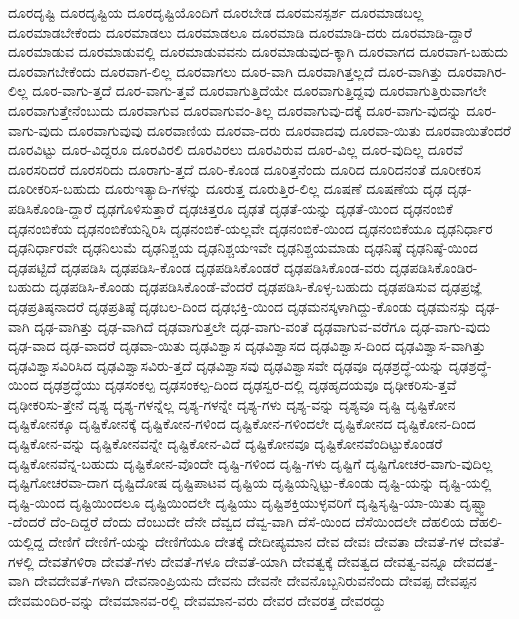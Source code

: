 {ದೂರದೃಷ್ಟಿ
ದೂರದೃಷ್ಟಿಯ
ದೂರದೃಷ್ಟಿಯೊಂದಿಗೆ
ದೂರಬೇಡ
ದೂರಮನಸ್ಪರ್ಶ
ದೂರಮಾಡಬಲ್ಲ
ದೂರಮಾಡಬೇಕೆಂದು
ದೂರಮಾಡಲು
ದೂರಮಾಡಲೂ
ದೂರಮಾಡಿ
ದೂರಮಾಡಿ-ದರು
ದೂರಮಾಡಿ-ದ್ದಾರೆ
ದೂರಮಾಡುವ
ದೂರಮಾಡುವಲ್ಲಿ
ದೂರಮಾಡುವವನು
ದೂರಮಾಡುವುದ-ಕ್ಕಾಗಿ
ದೂರವಾಗದ
ದೂರವಾಗ-ಬಹುದು
ದೂರವಾಗಬೇಕೆಂದು
ದೂರವಾಗ-ಲಿಲ್ಲ
ದೂರವಾಗಲು
ದೂರ-ವಾಗಿ
ದೂರವಾಗಿತ್ತಲ್ಲದೆ
ದೂರ-ವಾಗಿತ್ತು
ದೂರವಾಗಿರ-ಲಿಲ್ಲ
ದೂರ-ವಾಗು-ತ್ತದೆ
ದೂರ-ವಾಗು-ತ್ತವೆ
ದೂರವಾಗುತ್ತಿದೆಯೇ
ದೂರವಾಗುತ್ತಿದ್ದವು
ದೂರವಾಗುತ್ತಿರುವಾಗಲೇ
ದೂರವಾಗುತ್ತೇನೆಂಬುದು
ದೂರವಾಗುವ
ದೂರವಾಗುವಂ-ತಿಲ್ಲ
ದೂರವಾಗುವು-ದಕ್ಕೆ
ದೂರ-ವಾಗು-ವುದನ್ನು
ದೂರ-ವಾಗು-ವುದು
ದೂರವಾಗುವುವು
ದೂರವಾಣಿಯ
ದೂರವಾ-ದರು
ದೂರವಾದವು
ದೂರವಾ-ಯಿತು
ದೂರವಾಯಿತೆಂದರೆ
ದೂರವಿಟ್ಟು
ದೂರ-ವಿದ್ದರೂ
ದೂರವಿರಲಿ
ದೂರವಿರಲು
ದೂರವಿರುವ
ದೂರ-ವಿಲ್ಲ
ದೂರ-ವುದಿಲ್ಲ
ದೂರವೆ
ದೂರಸರಿದರೆ
ದೂರಸರಿದು
ದೂರಾಗು-ತ್ತದೆ
ದೂರಿ-ಕೊಂಡ
ದೂರಿತ್ತನೆಂದು
ದೂರಿದ
ದೂರಿದನಂತೆ
ದೂರೀಕರಿಸ
ದೂರೀಕರಿಸ-ಬಹುದು
ದೂರುಇತ್ಯಾದಿ-ಗಳನ್ನು
ದೂರುತ್ತ
ದೂರುತ್ತಿರ-ಲಿಲ್ಲ
ದೂಷಣೆ
ದೂಷಣೆಯ
ದೃಢ
ದೃಢ-ಪಡಿಸಿಕೊಂಡಿ-ದ್ದಾರೆ
ದೃಢಗೊಳಿಸುತ್ತಾರೆ
ದೃಢಚಿತ್ತರೂ
ದೃಢತೆ
ದೃಢತೆ-ಯನ್ನು
ದೃಢತೆ-ಯಿಂದ
ದೃಢನಂಬಿಕೆ
ದೃಢನಂಬಿಕೆಯ
ದೃಢನಂಬಿಕೆಯನ್ನಿರಿಸಿ
ದೃಢನಂಬಿಕೆ-ಯಲ್ಲವೇ
ದೃಢನಂಬಿಕೆ-ಯಿಂದ
ದೃಢನಂಬಿಕೆಯೂ
ದೃಢನಿರ್ಧಾರ
ದೃಢನಿರ್ಧಾರವೇ
ದೃಢನಿಲುಮೆ
ದೃಢನಿಶ್ಚಯ
ದೃಢನಿಶ್ಚಯಇವೇ
ದೃಢನಿಶ್ಚಯಮಾಡು
ದೃಢನಿಷ್ಠೆ
ದೃಢನಿಷ್ಠೆ-ಯಿಂದ
ದೃಢಪಟ್ಟಿದೆ
ದೃಢಪಡಿಸಿ
ದೃಢಪಡಿಸಿ-ಕೊಂಡ
ದೃಢಪಡಿಸಿಕೊಂಡರೆ
ದೃಢಪಡಿಸಿಕೊಂಡ-ವರು
ದೃಢಪಡಿಸಿಕೊಂಡಿರ-ಬಹುದು
ದೃಢಪಡಿಸಿ-ಕೊಂಡು
ದೃಢಪಡಿಸಿಕೊಂಡೆ-ವೆಂದರೆ
ದೃಢಪಡಿಸಿ-ಕೊಳ್ಳ-ಬಹುದು
ದೃಢಪಡಿಸುವ
ದೃಢಪ್ರಜ್ಞೆ
ದೃಢಪ್ರತಿಷ್ಠನಾದರೆ
ದೃಢಪ್ರತಿಷ್ಠೆ
ದೃಢಬಲ-ದಿಂದ
ದೃಢಭಕ್ತಿ-ಯಿಂದ
ದೃಢಮನಸ್ಕಳಾಗಿದ್ದು-ಕೊಂಡು
ದೃಢಮನಸ್ಸು
ದೃಢ-ವಾಗಿ
ದೃಢ-ವಾಗಿತ್ತು
ದೃಢ-ವಾಗಿದೆ
ದೃಢವಾಗುತ್ತಲೇ
ದೃಢ-ವಾಗು-ವಂತೆ
ದೃಢವಾಗುವ-ವರೆಗೂ
ದೃಢ-ವಾಗು-ವುದು
ದೃಢ-ವಾದ
ದೃಢ-ವಾದರೆ
ದೃಢವಾ-ಯಿತು
ದೃಢವಿಶ್ವಾಸ
ದೃಢವಿಶ್ವಾಸದ
ದೃಢವಿಶ್ವಾಸ-ದಿಂದ
ದೃಢವಿಶ್ವಾಸ-ವಾಗಿತ್ತು
ದೃಢವಿಶ್ವಾಸವಿರಿಸಿದ
ದೃಢವಿಶ್ವಾಸವಿರು-ತ್ತದೆ
ದೃಢವಿಶ್ವಾಸವು
ದೃಢವಿಶ್ವಾಸವೇ
ದೃಢವೂ
ದೃಢಶ್ರದ್ಧೆ-ಯನ್ನು
ದೃಢಶ್ರದ್ಧೆ-ಯಿಂದ
ದೃಢಶ್ರದ್ಧೆಯು
ದೃಢಸಂಕಲ್ಪ
ದೃಢಸಂಕಲ್ಪ-ದಿಂದ
ದೃಢಸ್ವರ-ದಲ್ಲಿ
ದೃಢಹೃದಯವೂ
ದೃಢೀಕರಿಸು-ತ್ತವೆ
ದೃಢೀಕರಿಸು-ತ್ತೇನೆ
ದೃಶ್ಯ
ದೃಶ್ಯ-ಗಳನ್ನೆಲ್ಲ
ದೃಶ್ಯ-ಗಳನ್ನೇ
ದೃಶ್ಯ-ಗಳು
ದೃಶ್ಯ-ವನ್ನು
ದೃಶ್ಯವೂ
ದೃಷ್ಟಿ
ದೃಷ್ಟಿಕೋನ
ದೃಷ್ಟಿಕೋನಕ್ಕೂ
ದೃಷ್ಟಿಕೋನಕ್ಕೆ
ದೃಷ್ಟಿಕೋನ-ಗಳಿಂದ
ದೃಷ್ಟಿಕೋನ-ಗಳಿಂದಲೇ
ದೃಷ್ಟಿಕೋನದ
ದೃಷ್ಟಿಕೋನ-ದಿಂದ
ದೃಷ್ಟಿಕೋನ-ವನ್ನು
ದೃಷ್ಟಿಕೋನವನ್ನೇ
ದೃಷ್ಟಿಕೋನ-ವಿದೆ
ದೃಷ್ಟಿಕೋನವೂ
ದೃಷ್ಟಿಕೋನವೆಂದಿಟ್ಟುಕೊಂಡರೆ
ದೃಷ್ಟಿಕೋನವೆನ್ನ-ಬಹುದು
ದೃಷ್ಟಿಕೋನ-ವೊಂದೇ
ದೃಷ್ಟಿ-ಗಳಿಂದ
ದೃಷ್ಟಿ-ಗಳು
ದೃಷ್ಟಿಗೆ
ದೃಷ್ಟಿಗೋಚರ-ವಾಗು-ವುದಿಲ್ಲ
ದೃಷ್ಟಿಗೋಚರವಾ-ದಾಗ
ದೃಷ್ಟಿದೋಷ
ದೃಷ್ಟಿಪಾಟವ
ದೃಷ್ಟಿಯ
ದೃಷ್ಟಿಯನ್ನಿಟ್ಟು-ಕೊಂಡು
ದೃಷ್ಟಿ-ಯನ್ನು
ದೃಷ್ಟಿ-ಯಲ್ಲಿ
ದೃಷ್ಟಿ-ಯಿಂದ
ದೃಷ್ಟಿಯಿಂದಲೂ
ದೃಷ್ಟಿಯಿಂದಲೇ
ದೃಷ್ಟಿಯು
ದೃಷ್ಟಿಶಕ್ತಿಯುಳ್ಳವರಿಗೆ
ದೃಷ್ಟಿಸೃಷ್ಟಿ-ಯಾ-ಯಿತು
ದೃಷ್ಟ್ವಾ
-ದೆಂದರೆ
ದೆಂ-ದಿದ್ದರೆ
ದೆಂದು
ದೆಂಬುದೇ
ದೆನೇ
ದೆವ್ವದ
ದೆವ್ವ-ವಾಗಿ
ದೆಸೆ-ಯಿಂದ
ದೆಸೆಯಿಂದಲೇ
ದೆಹಲಿಯ
ದೆಹಲಿ-ಯಲ್ಲಿದ್ದ
ದೇಣಿಗೆ
ದೇಣಿಗೆ-ಯನ್ನು
ದೇಣಿಗೆಯೂ
ದೇತಕ್ಕೆ
ದೇದೀಪ್ಯಮಾನ
ದೇವ
ದೇವಃ
ದೇವತಾ
ದೇವತೆ-ಗಳ
ದೇವತೆ-ಗಳಲ್ಲಿ
ದೇವತೆಗಳಿರಾ
ದೇವತೆ-ಗಳು
ದೇವತೆ-ಗಳೂ
ದೇವತೆ-ಯಾಗಿ
ದೇವತ್ವಕ್ಕೆ
ದೇವತ್ವದ
ದೇವತ್ವ-ವನ್ನೂ
ದೇವದತ್ತ-ವಾಗಿ
ದೇವದೇವತೆ-ಗಳಾಗಿ
ದೇವನಾಂಪ್ರಿಯನು
ದೇವನು
ದೇವನೇ
ದೇವನೊಬ್ಬನಿರುವನೆಂದು
ದೇವಪ್ಪ
ದೇವಪ್ಪನ
ದೇವಮಂದಿರ-ವನ್ನು
ದೇವಮಾನವ-ರಲ್ಲಿ
ದೇವಮಾನ-ವರು
ದೇವರ
ದೇವರತ್ತ
ದೇವರದ್ದು
}
